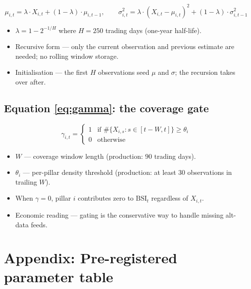 \documentclass[11pt,a4paper]{article}
\begin{document}
\[
\mu_{i,t} = \lambda \cdot X_{i,t} + (1 - \lambda) \cdot \mu_{i,t-1}, \qquad
\sigma^2_{i,t} = \lambda \cdot (X_{i,t} - \mu_{i,t})^2 + (1 - \lambda) \cdot \sigma^2_{i,t-1}
\]

\begin{itemize}[leftmargin=*]
\item $\lambda = 1 - 2^{-1/H}$ where $H = 250$ trading days (one-year half-life).
\item Recursive form --- only the current observation and previous estimate are needed; no rolling window storage.
\item Initialisation --- the first $H$ observations seed $\mu$ and $\sigma$; the recursion takes over after.
\end{itemize}

\subsection*{Equation \ref{eq:gamma}: the coverage gate}

\[
\gamma_{i,t} = \begin{cases} 1 & \text{if } \#\{X_{i,s} : s \in [t - W, t]\} \ge \theta_i \\ 0 & \text{otherwise} \end{cases}
\]

\begin{itemize}[leftmargin=*]
\item $W$ --- coverage window length (production: $90$ trading days).
\item $\theta_i$ --- per-pillar density threshold (production: at least $30$ observations in trailing $W$).
\item When $\gamma = 0$, pillar $i$ contributes zero to $\text{BSI}_t$ regardless of $X_{i,t}$.
\item Economic reading --- gating is the conservative way to handle missing alt-data feeds.
\end{itemize}

\section{Appendix: Pre-registered parameter table}
\end{document}
